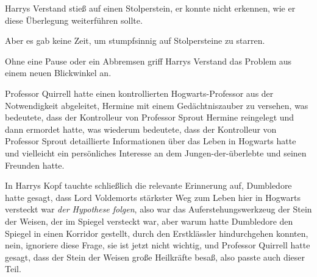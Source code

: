 Harrys Verstand stieß auf einen Stolperstein, er konnte nicht erkennen, wie er diese Überlegung weiterführen sollte.

Aber es gab keine Zeit, um stumpfsinnig auf Stolpersteine zu starren.

Ohne eine Pause oder ein Abbremsen griff Harrys Verstand das Problem aus einem neuen Blickwinkel an.

Professor Quirrell hatte einen kontrollierten Hogwarts-Professor aus der Notwendigkeit abgeleitet, Hermine mit einem Gedächtniszauber zu versehen, was bedeutete, dass der Kontrolleur von Professor Sprout Hermine reingelegt und dann ermordet hatte, was wiederum bedeutete, dass der Kontrolleur von Professor Sprout detaillierte Informationen über das Leben in Hogwarts hatte und vielleicht ein persönliches Interesse an dem Jungen-der-überlebte und seinen Freunden hatte.

In Harrys Kopf tauchte schließlich die relevante Erinnerung auf, Dumbledore hatte gesagt, dass Lord Voldemorts stärkster Weg zum Leben hier in Hogwarts versteckt war \emph{der Hypothese folgen}, also war das Auferstehungswerkzeug der Stein der Weisen, der im Spiegel versteckt war, aber warum hatte Dumbledore den Spiegel in einen Korridor gestellt, durch den Erstklässler hindurchgehen konnten, nein, ignoriere diese Frage, sie ist jetzt nicht wichtig, und Professor Quirrell hatte gesagt, dass der Stein der Weisen große Heilkräfte besaß, also passte auch dieser Teil.

